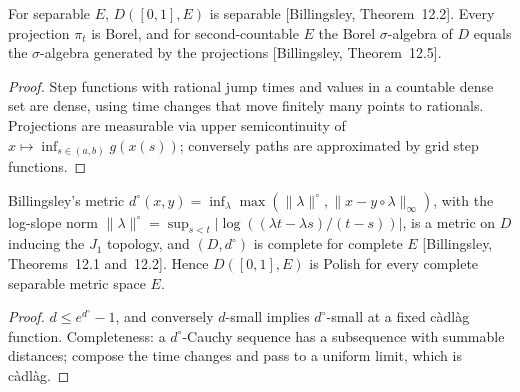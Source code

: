 \begin{theorem}
  \label{thm:skorokhod-borel}
  \leanok
  For separable $E$, $D([0,1], E)$ is separable [Billingsley, Theorem~12.2]. Every projection $\pi_t$ is Borel, and for
  second-countable $E$ the Borel $\sigma$-algebra of $D$ equals the $\sigma$-algebra generated by the projections
  [Billingsley, Theorem~12.5].
\end{theorem}
\begin{proof}
  \leanok
  Step functions with rational jump times and values in a countable dense set are dense, using time changes
  that move finitely many points to rationals. Projections are measurable via upper semicontinuity of
  $x \mapsto \inf_{s \in (a,b)} g(x(s))$; conversely paths are approximated by grid step functions.
\end{proof}

\begin{theorem}[$D$ is Polish]
  \label{thm:skorokhod-polish}
  \leanok
  Billingsley's metric $d^\circ(x, y) = \inf_\lambda \max(\|\lambda\|^\circ, \|x - y \circ \lambda\|_\infty)$, with the log-slope norm
  $\|\lambda\|^\circ = \sup_{s < t} |\log((\lambda t - \lambda s)/(t - s))|$, is a metric on $D$ inducing the $J_1$ topology, and $(D, d^\circ)$ is
  complete for complete $E$ [Billingsley, Theorems~12.1 and~12.2]. Hence $D([0,1], E)$ is Polish for every complete
  separable metric space $E$.
\end{theorem}
\begin{proof}
  \leanok
  $d \le e^{d^\circ} - 1$, and conversely $d$-small implies $d^\circ$-small at a fixed c\`adl\`ag function. Completeness: a $d^\circ$-Cauchy
  sequence has a subsequence with summable distances; compose the time changes and pass to a uniform limit, which
  is c\`adl\`ag.
\end{proof}

